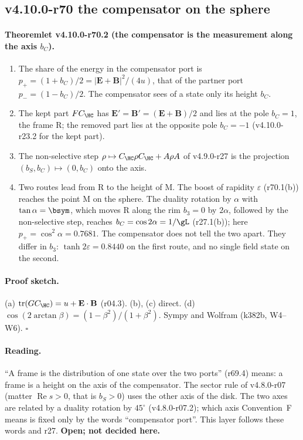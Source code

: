 \subsection*{v4.10.0-r70 the compensator on the sphere}
\label{subsec:v4100-r70-compensator}

\paragraph{Theoremlet v4.10.0-r70.2 (the compensator is the measurement along the axis \(b_C\)).}
\begin{enumerate}[leftmargin=2em]
\item[(a)] The share of the energy in the compensator port is \(p_+=(1+b_C)/2=|\mathbf E+\mathbf B|^2/(4u)\), that of the partner port
\(p_-=(1-b_C)/2\).  The compensator sees of a state only its height \(b_C\).
\item[(b)] The kept part \(FC_{\HC}\) has \(\mathbf E'=\mathbf B'=(\mathbf E+\mathbf B)/2\) and lies at the pole \(b_C=1\), the frame R; the
removed part lies at the opposite pole \(b_C=-1\) (v4.10.0-r23.2 for the kept part).
\item[(c)] The non-selective step \(\rho\mapsto C_{\HC}\rho C_{\HC}+A\rho A\) of v4.9.0-r27 is the projection \((b_S,b_C)\mapsto(0,b_C)\)
onto the axis.
\item[(d)] Two routes lead from R to the height of M.  The boost of rapidity \(\varepsilon\) (r70.1(b)) reaches the point M on the sphere.
The duality rotation by \(\alpha\) with \(\tan\alpha=\bsym\), which moves R along the rim \(b_3=0\) by \(2\alpha\), followed by the
non-selective step, reaches \(b_C=\cos2\alpha=1/\gL\) (r27.1(b)); here \(p_+=\cos^2\alpha=0.7681\).  The compensator does not tell the two
apart.  They differ in \(b_3\): \(\tanh2\varepsilon=0.8440\) on the first route, and no single field state on the second.
\end{enumerate}

\paragraph{Proof sketch.}
(a) \(\operatorname{tr}(GC_{\HC})=u+\mathbf E\cdot\mathbf B\) (r04.3).  (b), (c) direct.  (d) \(\cos(2\arctan\beta)=(1-\beta^2)/(1+\beta^2)\).
Sympy and Wolfram (k382b, W4--W6).  \(\square\)

\paragraph{Reading.}
``A frame is the distribution of one state over the two ports'' (r69.4) means: a frame is a height on the axis of the compensator.  The
sector rule of v4.8.0-r07 (matter \(\operatorname{Re}s>0\), that is \(b_S>0\)) uses the other axis of the disk.  The two axes are related by a
duality rotation by \(45^\circ\) (v4.8.0-r07.2); which axis Convention~F means is fixed only by the words ``compensator port''.  This layer
follows these words and r27.  \textbf{Open; not decided here.}

